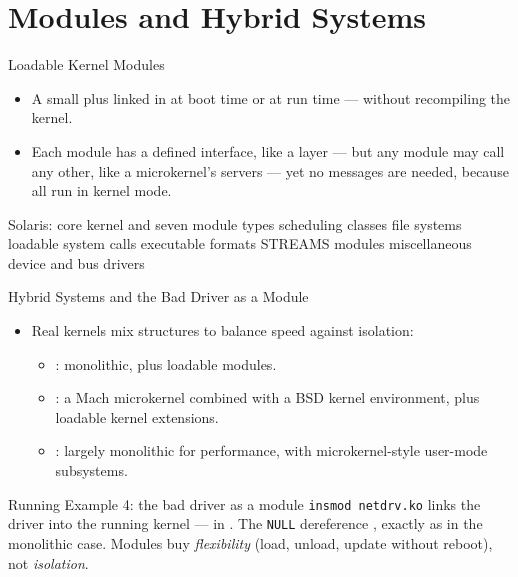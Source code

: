 \documentclass[aspectratio=169]{beamer}
\begin{document}
\section{Modules and Hybrid Systems}

\begin{frame}{Loadable Kernel Modules}
  \begin{itemize}
    \item A small  plus  linked in at
      boot time or at run time --- without recompiling the kernel.
    \item Each module has a defined interface, like a layer --- but any module
      may call any other, like a microkernel's servers --- yet no messages
      are needed, because all run in kernel mode.
  \end{itemize}
  \vspace{0.1cm}
  \begin{block}{Solaris: core kernel and seven module types}
    scheduling classes \textbullet{} file systems \textbullet{} loadable
    system calls \textbullet{} executable formats \textbullet{} STREAMS
    modules \textbullet{} miscellaneous \textbullet{} device and bus drivers
  \end{block}
\end{frame}

\begin{frame}{Hybrid Systems and the Bad Driver as a Module}
  \begin{itemize}
    \item Real kernels mix structures to balance speed against isolation:
      \begin{itemize}
        \item {}: monolithic, plus loadable modules.
        \item {}: a Mach microkernel combined with a BSD kernel
          environment, plus loadable kernel extensions.
        \item {}: largely monolithic for performance, with
          microkernel-style user-mode subsystems.
      \end{itemize}
  \end{itemize}
  \vspace{0.1cm}
  \begin{exampleblock}{Running Example 4: the bad driver as a module}
    \texttt{insmod netdrv.ko} links the driver into the running kernel ---
    in . The \texttt{NULL} dereference , exactly as in the monolithic case. Modules buy
    \emph{flexibility} (load, unload, update without reboot), not
    \emph{isolation}.
  \end{exampleblock}
\end{frame}
\end{document}
